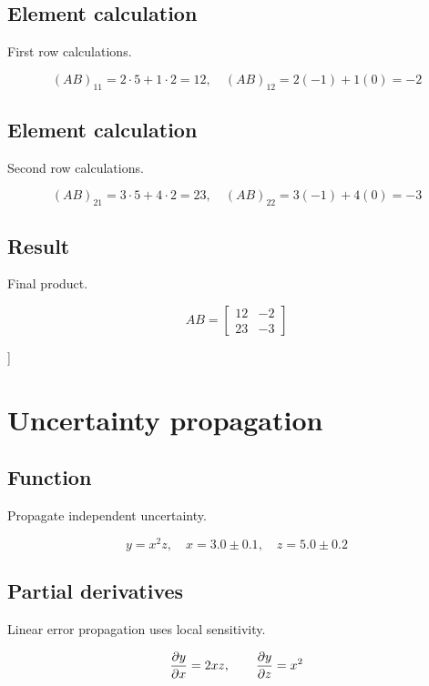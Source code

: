 \documentclass[11pt,a4paper]{article}
\begin{document}
\subsection{Element calculation}
First row calculations.
\begin{derivationbox}
\[
(AB)_{11}=2\cdot5+1\cdot2=12,\quad (AB)_{12}=2(-1)+1(0)=-2
\]
\end{derivationbox}

\subsection{Element calculation}
Second row calculations.
\begin{derivationbox}
\[
(AB)_{21}=3\cdot5+4\cdot2=23,\quad (AB)_{22}=3(-1)+4(0)=-3
\]
\end{derivationbox}

\subsection{Result}
Final product.
\begin{derivationbox}
\[
AB=\begin{bmatrix}12&-2\\23&-3\end{bmatrix}
\]
\end{derivationbox}

\begin{resultbox} [[12. -2.]
 [23. -3.]] \end{resultbox}

\section{Uncertainty propagation}

\subsection{Function}
Propagate independent uncertainty.
\begin{derivationbox}
\[
y=x^2z,\quad x=3.0\pm0.1,\quad z=5.0\pm0.2
\]
\end{derivationbox}

\subsection{Partial derivatives}
Linear error propagation uses local sensitivity.
\begin{derivationbox}
\[
\pdv{y}{x}=2xz,\qquad \pdv{y}{z}=x^2
\]
\end{derivationbox}
\end{document}

